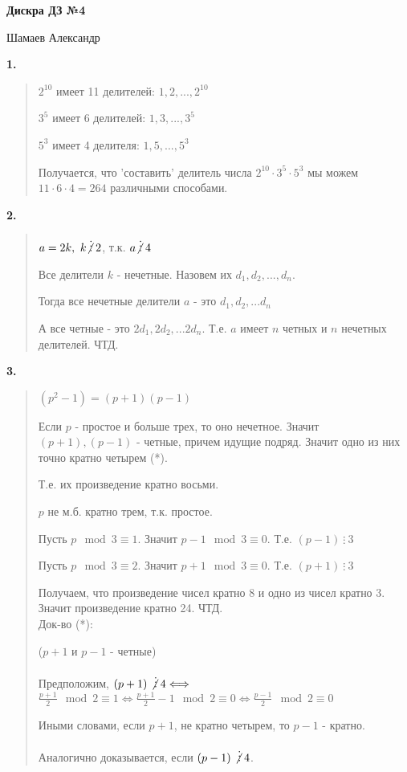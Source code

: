 \documentclass{article}
\begin{document}
\setlength{\parindent}{0pt}
\begin{Large}
    \textsf{\textbf{Дискра ДЗ №4}}
    
    Шамаев Александр    
\end{Large}
\vspace{1cm}



\textsf{\textbf{1.}}
\begin{quote}
$2^{10}$ имеет 11 делителей: $1,  2  , ... , 2^{10}$

$3^{5}$ имеет 6 делителей: $1,  3  , ..., 3^{5}$

$5^{3}$ имеет 4 делителя: $1,  5  , ..., 5^{3}$

Получается, что 'составить' делитель числа $2^{10} \cdot 3^5 \cdot 5^3$ мы можем $11 \cdot 6 \cdot 4 = 264$ различными способами.
\end{quote}

\textsf{\textbf{2.}}
\begin{quote}
$a = 2k, \ k \centernot\vdots 2$, т.к. $a \centernot \vdots 4$

Все делители $k$ - нечетные. Назовем их $d_1, d_2,...,d_n$.

Тогда все нечетные делители $a$ - это $d_1, d_2, ... d_n$

А все четные  - это $2d_1, 2d_2, ... 2d_n$. Т.е. $a$ имеет $n$ четных и $n$ нечетных делителей. ЧТД.
\end{quote}

\textsf{\textbf{3.}}
\begin{quote}
$(p^2 - 1) = (p + 1)(p - 1)$

Если $p$ - простое и больше трех, то оно нечетное. Значит $(p + 1), (p - 1)$ - четные, причем идущие подряд. Значит одно из них точно кратно четырем (*). 

Т.е. их произведение кратно восьми. 

$p$ не м.б. кратно трем, т.к. простое.

Пусть $p \mod 3 \equiv 1$. Значит $p - 1 \mod 3 \equiv 0$. Т.е. $(p - 1) \ \vdots \ 3$

Пусть $p \mod 3 \equiv 2$. Значит $p + 1 \mod 3 \equiv 0$. Т.е. $(p + 1) \ \vdots \ 3$

Получаем, что произведение чисел кратно 8 и одно из чисел кратно 3. Значит произведение кратно 24. ЧТД. \\

Док-во (*): 

($p + 1$ и $p - 1$ - четные)

Предположим, 
$(p + 1) \ \centernot\vdots 4 \Longleftrightarrow$ $\frac{p + 1}{2} \mod 2 \equiv 1
\Longleftrightarrow \frac{p + 1}{2} - 1 \mod 2 \equiv 0 \Longleftrightarrow \frac{p - 1}{2} \mod 2 \equiv 0$

Иными словами, если $p + 1$, не кратно четырем, то $p - 1$ - кратно.

Аналогично доказывается, если $(p - 1) \ \centernot\vdots 4$.
\end{quote}
\end{document}
